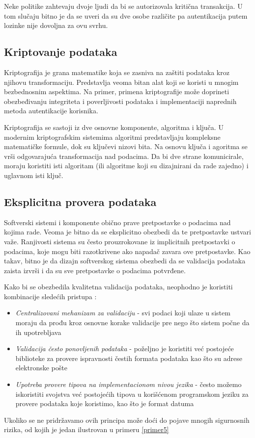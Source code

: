 \documentclass[a4paper]{article}
\begin{document}
Neke politike zahtevaju dvoje ljudi da bi se autorizovala kritična transakcija. U tom slučaju 
bitno je da se uveri da su dve osobe različite pa autentikacija putem lozinke nije dovoljna za ovu svrhu.

\subsection{Kriptovanje podataka}

Kriptografija \cite{CRYP} je grana matematike koja se zasniva na zaštiti podataka kroz njihovu transformaciju. Predstavlja veoma bitan alat koji se koristi u mnogim bezbednosnim aspektima. Na primer, primena kriptografije može doprineti obezbeđivanju integriteta i poverljivosti podataka i implementaciji naprednih metoda autentikacije korisnika.

Kriptografija se sastoji iz dve osnovne komponente, algoritma i ključa. U modernim kriptografskim sistemima algoritmi predstavljaju kompleksne matematičke formule, dok su ključevi nizovi bita. Na osnovu ključa i agoritma se vrši odgovarajuća transformacija nad podacima. Da bi dve strane komunicirale, moraju koristiti isti algoritam (ili algoritme koji su dizajnirani da rade zajedno) i uglavnom isti ključ.

\subsection{Eksplicitna provera podataka}

Softverski sistemi i komponente obično prave pretpostavke o podacima nad kojima rade. Veoma je bitno da se eksplicitno obezbedi da te pretpostavke ustvari važe. Ranjivosti sistema su često prouzrokovane iz implicitnih pretpostavki o podacima, koje mogu biti razotkrivene ako napadač zavara ove pretpostavke.
Kao takav, bitno je da dizajn softverskog sistema obezbedi da se validacija podataka zaista izvrši i da su sve 
pretpostavke o podacima potvrđene.

Kako bi se obezbedila kvalitetna validacija podataka, neophodno je koristiti kombinacije sledećih pristupa \cite{Top10Flaws}:
\begin{itemize}
	\item \textit{Centralizovani mehanizam za validaciju} - svi podaci koji ulaze u sistem moraju da prođu kroz osnovne korake validacije pre nego što sistem počne da ih upotrebljava
	\item \textit{Validacija često ponovljenih podataka} - poželjno je koristiti već postojeće biblioteke za provere ispravnosti čestih formata podataka kao što su adrese elektronske pošte
	\item \textit{Upotreba provere tipova na implementacionom nivou jezika} - često možemo iskoristiti svojstva već postojećih tipova u korišćenom programskom jeziku za provere podataka koje koristimo, kao što je format datuma
\end{itemize}
Ukoliko se ne pridržavamo ovih principa može doći do pojave mnogih sigurnosnih rizika, od kojih je jedan ilustrovan u primeru \ref{primer5}
\end{document}
